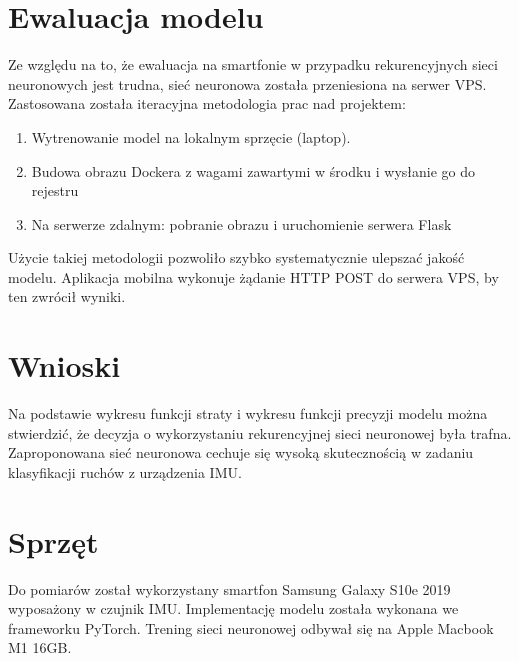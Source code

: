 \documentclass[10pt]{article}
\begin{document}
\section{Ewaluacja modelu}

Ze względu na to, że ewaluacja na smartfonie w przypadku rekurencyjnych sieci neuronowych jest trudna, sieć neuronowa została przeniesiona na serwer VPS. Zastosowana została iteracyjna metodologia prac nad projektem: 

\begin{enumerate}
  \item Wytrenowanie model na lokalnym sprzęcie (laptop).
  \item Budowa obrazu Dockera z wagami zawartymi w środku i wysłanie go do rejestru
  \item Na serwerze zdalnym: pobranie obrazu i uruchomienie serwera Flask
\end{enumerate}

Użycie takiej metodologii pozwoliło szybko systematycznie ulepszać jakość modelu. Aplikacja mobilna wykonuje żądanie HTTP POST do serwera VPS, by ten zwrócił wyniki.

\section{Wnioski}

Na podstawie wykresu funkcji straty i wykresu funkcji precyzji modelu można stwierdzić, że decyzja o wykorzystaniu rekurencyjnej sieci neuronowej była trafna. Zaproponowana sieć neuronowa cechuje się wysoką skutecznością w zadaniu klasyfikacji ruchów z urządzenia IMU.

\section{Sprzęt}

Do pomiarów został wykorzystany smartfon Samsung Galaxy S10e 2019 wyposażony w czujnik IMU. Implementację modelu została wykonana we frameworku PyTorch. Trening sieci neuronowej odbywał się na Apple Macbook M1 16GB.



\end{document}
